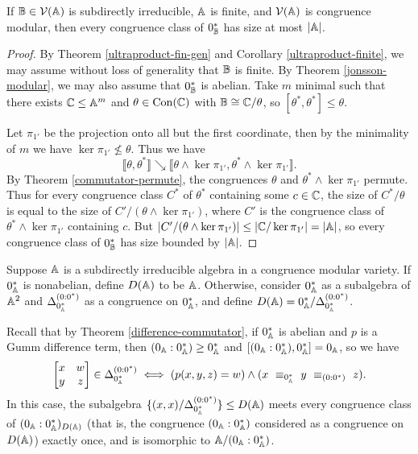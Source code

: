 \documentclass[letterpaper,11pt]{article}
\DeclareMathOperator{\Con}{Con}
\begin{document}
\begin{prop}\label{monolith-bound} If $\mathbb{B} \in \mathcal{V}(\mathbb{A})$ is subdirectly irreducible, $\mathbb{A}$ is finite, and $\mathcal{V}(\mathbb{A})$ is congruence modular, then every congruence class of $0_{\mathbb{B}}^*$ has size at most $|\mathbb{A}|$.
\end{prop}
\begin{proof} By Theorem \ref{ultraproduct-fin-gen} and Corollary \ref{ultraproduct-finite}, we may assume without loss of generality that $\mathbb{B}$ is finite. By Theorem \ref{jonsson-modular}, we may also assume that $0_{\mathbb{B}}^*$ is abelian. Take $m$ minimal such that there exists $\mathbb{C} \le \mathbb{A}^m$ and $\theta \in \Con(\bC)$ with $\mathbb{B} \cong \mathbb{C}/\theta$, so $[\theta^*,\theta^*] \le \theta$.

Let $\pi_{1'}$ be the projection onto all but the first coordinate, then by the minimality of $m$ we have $\ker \pi_{1'} \not\le \theta$. Thus we have
\[
\llbracket \theta, \theta^* \rrbracket \searrow \llbracket \theta \wedge \ker \pi_{1'}, \theta^*\wedge \ker\pi_{1'} \rrbracket.
\]
By Theorem \ref{commutator-permute}, the congruences $\theta$ and $\theta^*\wedge \ker \pi_{1'}$ permute. Thus for every congruence class $C^*$ of $\theta^*$ containing some $c \in \mathbb{C}$, the size of $C^*/\theta$ is equal to the size of $C'/(\theta\wedge \ker\pi_{1'})$, where $C'$ is the congruence class of $\theta^*\wedge\ker\pi_{1'}$ containing $c$. But $|C'/(\theta\wedge \ker\pi_{1'})| \le |\mathbb{C}/\ker \pi_{1'}| = |\mathbb{A}|$, so every congruence class of $0_{\mathbb{B}}^*$ has size bounded by $|\mathbb{A}|$.
\end{proof}

\begin{defn} Suppose $\mathbb{A}$ is a subdirectly irreducible algebra in a congruence modular variety. If $0_{\mathbb{A}}^*$ is nonabelian, define $D(\mathbb{A})$ to be $\mathbb{A}$. Otherwise, consider $0_{\mathbb{A}}^*$ as a subalgebra of $\mathbb{A}^2$ and $\Delta_{0_{\mathbb{A}}^*}^{(0:0^*)}$ as a congruence on $0_{\mathbb{A}}^*$, and define $D(\mathbb{A}) = 0_{\mathbb{A}}^*/\Delta_{0_{\mathbb{A}}^*}^{(0:0^*)}$.
\end{defn}

Recall that by Theorem \ref{difference-commutator}, if $0_{\mathbb{A}}^*$ is abelian and $p$ is a Gumm difference term, then $(0_{\mathbb{A}}:0_{\mathbb{A}}^*) \ge 0_{\mathbb{A}}^*$ and $[(0_{\mathbb{A}}:0_{\mathbb{A}}^*),0_{\mathbb{A}}^*] = 0_{\mathbb{A}}$, so we have
\[
\begin{bmatrix} x & w\\ y & z\end{bmatrix} \in \Delta_{0_{\mathbb{A}}^*}^{(0:0^*)} \iff (p(x,y,z) = w) \wedge (x\ \equiv_{0_{\mathbb{A}}^*}\ y\ \equiv_{(0:0^*)}\ z).
\]
In this case, the subalgebra $\{(x,x)/\Delta_{0_{\mathbb{A}}^*}^{(0:0^*)}\} \le D(\mathbb{A})$ meets every congruence class of $(0_{\mathbb{A}}:0_{\mathbb{A}}^*)_{D(\mathbb{A})}$ (that is, the congruence $(0_{\mathbb{A}}:0_{\mathbb{A}}^*)$ considered as a congruence on $D(\mathbb{A})$) exactly once, and is isomorphic to $\mathbb{A}/(0_{\mathbb{A}}:0_{\mathbb{A}}^*)$.
\end{document}
